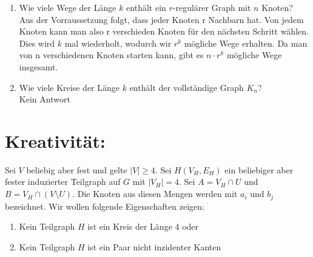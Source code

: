 \begin{enumerate}[label=(\alph*)]
        \item Wie viele Wege der Länge $k$ enthält ein $r$-regulärer Graph mit $n$ Knoten? \\
        Aus der Vorraussetzung folgt, dass jeder Knoten r Nachbarn hat. Von jedem Knoten kann man also r verschieden 
        Knoten für den nächsten Schritt wählen. Dies wird $k$ mal wiederholt, wodurch wir $r^k$ mögliche Wege erhalten. 
        Da man von n verschiedenen Knoten starten kann, gibt es $n \cdot r^k$ mögliche Wege insgesamt.
        
        \item Wie viele Kreise der Länge $k$ enthält der vollständige Graph $K_n$? \\
        Kein Antwort
    \end{enumerate}

    \section*{Kreativität:}
    Sei $V$ beliebig aber fest und gelte $|V| \ge 4$. Sei $H(V_H,E_H)$ ein beliebiger aber fester induzierter Teilgraph 
    auf $G$ mit $|V_H|=4$. Sei $A=V_H \cap U$ und $B=V_H \cap (V\setminus U)$. Die Knoten aus diesen Mengen werden mit
    $a_i$ und $b_j$ bezeichnet. Wir wollen folgende Eigenschaften zeigen:
    \begin{enumerate}[label=(\alph*)]
    	\item Kein Teilgraph $H$ ist ein Kreis der Länge 4 oder 
    	\item Kein Teilgraph $H$ ist ein Paar nicht inzidenter Kanten
    \end{enumerate}

